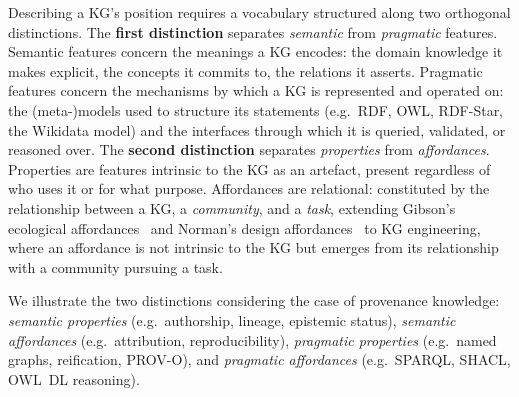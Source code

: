 \documentclass[runningheads]{llncs}
\newenvironment{onlyshort}{\ignorespaces}{\ignorespacesafterend}
\begin{document}
\begin{onlyshort}
Describing a KG's position requires a vocabulary structured along two orthogonal distinctions. 
The \textbf{first distinction} separates \emph{semantic} from \emph{pragmatic} features. 
Semantic features concern the meanings a KG encodes: the domain knowledge it makes explicit, the concepts it commits to, the relations it asserts. 
Pragmatic features concern the mechanisms by which a KG is represented and operated on: the (meta-)models used to structure its statements (e.g.\ RDF, OWL, RDF-Star, the Wikidata model) and the interfaces through which it is queried, validated, or reasoned over. 
The \textbf{second distinction} separates \emph{properties} 
from \emph{affordances}. 
Properties are features intrinsic to the 
KG as an artefact, present regardless of who uses it or for what 
purpose. 
Affordances are relational: constituted by the 
relationship between a KG, a \emph{community}, and a 
\emph{task}, extending Gibson's ecological 
affordances~\cite{gibson1977theory} and Norman's design 
affordances~\cite{norman1999affordance} to KG engineering, where an affordance is not intrinsic to the KG but emerges from its relationship with a community pursuing a task.

We illustrate the two distinctions considering the case of provenance knowledge: \emph{semantic properties} (e.g.\ authorship, lineage, epistemic status), \emph{semantic affordances} (e.g.\ attribution, reproducibility), \emph{pragmatic properties} (e.g.\ named graphs, reification, PROV-O), and \emph{pragmatic affordances} (e.g.\ SPARQL, SHACL, OWL~DL reasoning).
\end{onlyshort}
\end{document}
